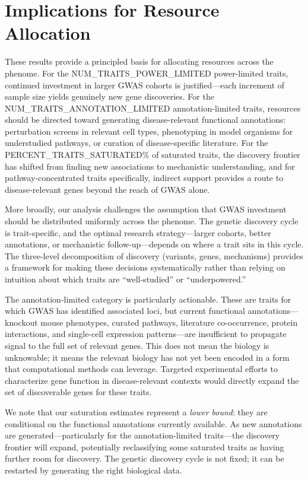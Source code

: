 \section{Implications for Resource Allocation}\label{sec:implications}

These results provide a principled basis for allocating resources across the phenome. For the {{NUM_TRAITS_POWER_LIMITED}} power-limited traits, continued investment in larger GWAS cohorts is justified---each increment of sample size yields genuinely new gene discoveries. For the {{NUM_TRAITS_ANNOTATION_LIMITED}} annotation-limited traits, resources should be directed toward generating disease-relevant functional annotations: perturbation screens in relevant cell types, phenotyping in model organisms for understudied pathways, or curation of disease-specific literature. For the {{PERCENT_TRAITS_SATURATED}}\% of saturated traits, the discovery frontier has shifted from finding new associations to mechanistic understanding, and for pathway-concentrated traits specifically, indirect support provides a route to disease-relevant genes beyond the reach of GWAS alone.

More broadly, our analysis challenges the assumption that GWAS investment should be distributed uniformly across the phenome. The genetic discovery cycle is trait-specific, and the optimal research strategy---larger cohorts, better annotations, or mechanistic follow-up---depends on where a trait sits in this cycle. The three-level decomposition of discovery (variants, genes, mechanisms) provides a framework for making these decisions systematically rather than relying on intuition about which traits are ``well-studied'' or ``underpowered.''

The annotation-limited category is particularly actionable. These are traits for which GWAS has identified associated loci, but current functional annotations---knockout mouse phenotypes, curated pathways, literature co-occurrence, protein interactions, and single-cell expression patterns---are insufficient to propagate signal to the full set of relevant genes. This does not mean the biology is unknowable; it means the relevant biology has not yet been encoded in a form that computational methods can leverage. Targeted experimental efforts to characterize gene function in disease-relevant contexts would directly expand the set of discoverable genes for these traits.

We note that our saturation estimates represent a \textit{lower bound}: they are conditional on the functional annotations currently available. As new annotations are generated---particularly for the annotation-limited traits---the discovery frontier will expand, potentially reclassifying some saturated traits as having further room for discovery. The genetic discovery cycle is not fixed; it can be restarted by generating the right biological data.
